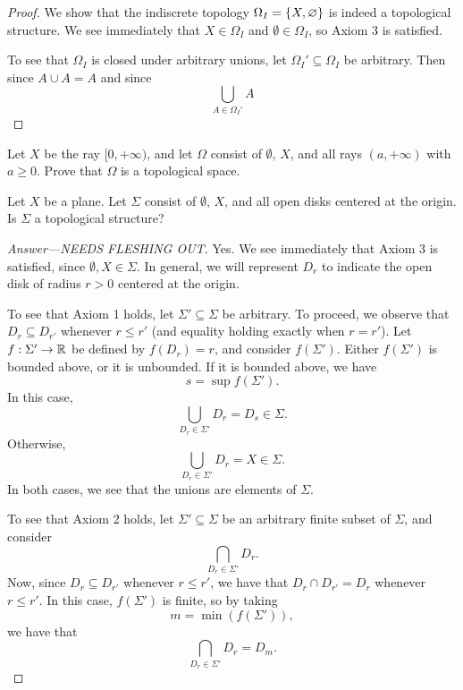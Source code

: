 \begin{proof}
    We show that the indiscrete topology $\Omega_I = \{X, \varnothing\}$ is
    indeed a topological structure. We see immediately that $X \in \Omega_I$ and
    $\emptyset \in \Omega_I$, so Axiom 3 is satisfied.

    To see that $\Omega_I$ is closed under arbitrary unions, let $\Omega_I'
    \subseteq \Omega_I$ be arbitrary. Then since $A \cup A = A$ and since 
    \[
        \bigcup_{A \in \Omega_I'} A
    \]
\end{proof}

\begin{minorEx} %
    Let $X$ be the ray $[0, +\infty)$, and let $\Omega$ consist of $\emptyset$, %
    $X$, and all rays $(a, +\infty)$ with $a \geq 0$. Prove that $\Omega$ is
    a topological space.
\end{minorEx}

\begin{minorEx} %
    Let $X$ be a plane. Let $\Sigma$ consist of $\emptyset$, $X$, and all open
    disks centered at the origin. Is $\Sigma$ a topological structure?
\end{minorEx}

\begin{proof}[Answer---NEEDS FLESHING OUT]
    Yes. We see immediately that Axiom 3 is satisfied, since $\emptyset, X \in
    \Sigma$. In general, we will represent $D_r$ to indicate the open disk of
    radius $r > 0$ centered at the origin.

    To see that Axiom 1 holds, let $\Sigma' \subseteq \Sigma$ be arbitrary. To
    proceed, we observe that $D_r \subseteq D_{r'}$ whenever $r \leq r'$ (and
    equality holding exactly when $r = r'$). Let $f : \Sigma' \to \mathbb{R}$ be
    defined by $f(D_r) = r$, and consider $f(\Sigma')$. Either $f(\Sigma')$ is
    bounded above, or it is unbounded. If it is bounded above, we have
    \[
        s = \sup f(\Sigma').
    \]
    In this case,
    \[
        \bigcup_{D_r \in \Sigma'} D_r = D_s \in \Sigma.
    \]
    Otherwise,
    \[
        \bigcup_{D_r \in \Sigma'} D_r = X \in \Sigma.
    \]
    In both cases, we see that the unions are elements of $\Sigma$.

    To see that Axiom 2 holds, let $\Sigma' \subseteq \Sigma$ be an arbitrary
    finite subset of $\Sigma$, and consider
    \[
        \bigcap_{D_r \in \Sigma'} D_r.
    \]
    Now, since $D_r \subseteq D_{r'}$ whenever $r \leq r'$, we have that $D_r
    \cap D_{r'} = D_r$ whenever $ r \leq r'$. In this case, $f(\Sigma')$ is
    finite, so by taking
    \[
        m = \min(f(\Sigma')),
    \]
    we have that
    \[
        \bigcap_{D_r \in \Sigma'} D_r = D_m.
    \]
\end{proof}

